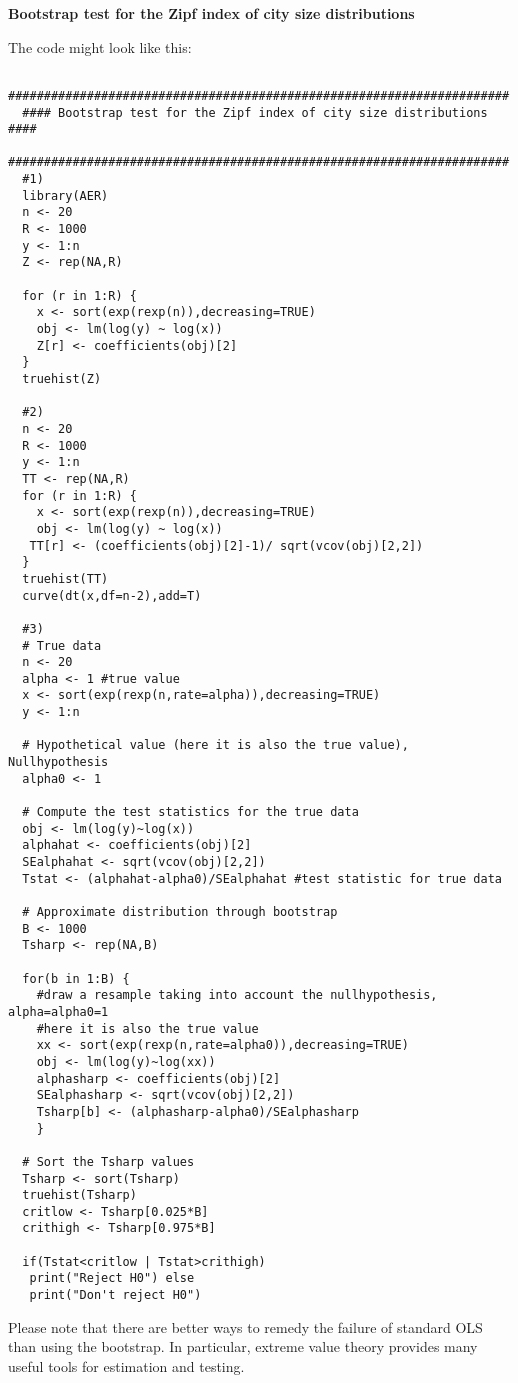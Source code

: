 \documentclass{article}
\begin{document}
\begin{solution}
\textbf{Bootstrap test for the Zipf index of city size distributions}

The code might look like this:
\begin{verbatim}
  ######################################################################
  #### Bootstrap test for the Zipf index of city size distributions ####
  ######################################################################
  #1)
  library(AER)
  n <- 20
  R <- 1000
  y <- 1:n
  Z <- rep(NA,R)

  for (r in 1:R) {
    x <- sort(exp(rexp(n)),decreasing=TRUE)
    obj <- lm(log(y) ~ log(x))
    Z[r] <- coefficients(obj)[2]
  }
  truehist(Z)

  #2)
  n <- 20
  R <- 1000
  y <- 1:n
  TT <- rep(NA,R)
  for (r in 1:R) {
    x <- sort(exp(rexp(n)),decreasing=TRUE)
    obj <- lm(log(y) ~ log(x))
   TT[r] <- (coefficients(obj)[2]-1)/ sqrt(vcov(obj)[2,2])
  }
  truehist(TT)
  curve(dt(x,df=n-2),add=T)

  #3)
  # True data
  n <- 20
  alpha <- 1 #true value
  x <- sort(exp(rexp(n,rate=alpha)),decreasing=TRUE)
  y <- 1:n

  # Hypothetical value (here it is also the true value), Nullhypothesis
  alpha0 <- 1

  # Compute the test statistics for the true data
  obj <- lm(log(y)~log(x))
  alphahat <- coefficients(obj)[2]
  SEalphahat <- sqrt(vcov(obj)[2,2])
  Tstat <- (alphahat-alpha0)/SEalphahat #test statistic for true data

  # Approximate distribution through bootstrap
  B <- 1000
  Tsharp <- rep(NA,B)

  for(b in 1:B) {
    #draw a resample taking into account the nullhypothesis, alpha=alpha0=1
    #here it is also the true value
    xx <- sort(exp(rexp(n,rate=alpha0)),decreasing=TRUE)
    obj <- lm(log(y)~log(xx))
    alphasharp <- coefficients(obj)[2]
    SEalphasharp <- sqrt(vcov(obj)[2,2])
    Tsharp[b] <- (alphasharp-alpha0)/SEalphasharp
    }

  # Sort the Tsharp values
  Tsharp <- sort(Tsharp)
  truehist(Tsharp)
  critlow <- Tsharp[0.025*B]
  crithigh <- Tsharp[0.975*B]

  if(Tstat<critlow | Tstat>crithigh)
   print("Reject H0") else
   print("Don't reject H0")
\end{verbatim}

Please note that there are better ways to remedy the failure of standard OLS than using the bootstrap. In particular, extreme value theory provides many useful tools for estimation and testing.
\end{solution}


%
\end{document}
